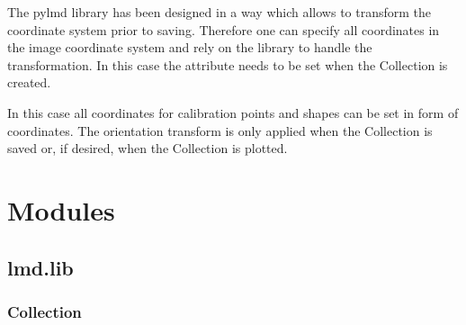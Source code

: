 \documentclass[letterpaper,10pt,english,openany,oneside]{sphinxmanual}
\begin{document}
\noindent{}

\sphinxAtStartPar
The py\sphinxhyphen{}lmd library has been designed in a way which allows to transform the coordinate system prior to saving. Therefore one can specify all coordinates in the image coordinate system and rely on the library to handle the transformation. In this case the  attribute needs to be set when the Collection is created.

\begin{sphinxVerbatim}[commandchars=\\\{\}]
  \PYG{p}{[}\PYG{p}{[} \PYG{p}{]} \PYG{p}{[} \PYG{p}{]} \PYG{p}{[} \PYG{p}{]}\PYG{p}{]}

    
  \PYG{p}{[}\PYG{p}{[} \PYG{p}{]} \PYG{p}{[} \PYG{p}{]}\PYG{p}{]}
\end{sphinxVerbatim}

\sphinxAtStartPar
In this case  all coordinates for calibration points and shapes can be set in form of  coordinates. The orientation transform is only applied when the Collection is saved or, if desired, when the Collection is plotted.


\chapter{Modules}
\label{\detokenize{pages/modules:modules}}\label{\detokenize{pages/modules::doc}}

\section{lmd.lib}
\label{\detokenize{pages/modules:lmd-lib}}

\subsection{Collection}
\label{\detokenize{pages/modules:collection}}
\end{document}
